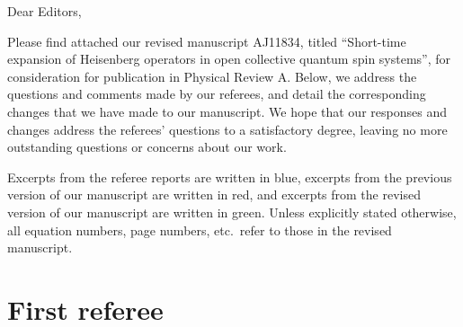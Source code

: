 \documentclass[preprint,superscriptaddress]{revtex4-2}
\newcommand{\1}{\mathds{1}}
\newcommand{\blue}[1]{{\color{blue} #1}}
\newcommand{\red}[1]{{\color{red} #1}}
\newcommand{\green}[1]{{\color{ForestGreen} #1}}
\begin{document}
Dear Editors,

Please find attached our revised manuscript AJ11834, titled
``Short-time expansion of Heisenberg operators in open collective
quantum spin systems'', for consideration for publication in Physical
Review A.  Below, we address the questions and comments made by our
referees, and detail the corresponding changes that we have made to
our manuscript.  We hope that our responses and changes address the
referees' questions to a satisfactory degree, leaving no more
outstanding questions or concerns about our work.

Excerpts from the referee reports are written in \blue{blue}, excerpts
from the previous version of our manuscript are written in \red{red},
and excerpts from the revised version of our manuscript are written in
\green{green}.  Unless explicitly stated otherwise, all equation
numbers, page numbers, etc.~refer to those in the revised manuscript.

\section{First referee}
\end{document}
